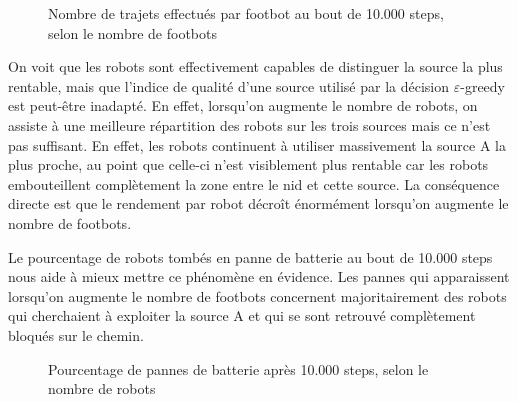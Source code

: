 \begin{figure}[htbp]
\centering
{}
\caption{Nombre de trajets effectués par footbot au bout de 10.000 steps, selon le nombre de footbots}
\end{figure}

On voit que les robots sont effectivement capables de distinguer la source la plus rentable, mais que l'indice de qualité d'une source utilisé par la décision $\varepsilon$-greedy est peut-être inadapté. En effet, lorsqu'on augmente le nombre de robots, on assiste à une meilleure répartition des robots sur les trois sources mais ce n'est pas suffisant. En effet, les robots continuent à utiliser massivement la source A la plus proche, au point que celle-ci n'est visiblement plus rentable car les robots embouteillent complètement la zone entre le nid et cette source. La conséquence directe est que le rendement par robot décroît énormément lorsqu'on augmente le nombre de footbots.

Le pourcentage de robots tombés en panne de batterie au bout de 10.000 steps nous aide à mieux mettre ce phénomène en évidence. Les pannes qui apparaissent lorsqu'on augmente le nombre de footbots concernent majoritairement des robots qui cherchaient à exploiter la source A et qui se sont retrouvé complètement bloqués sur le chemin.

\begin{figure}[htbp]
\centering
{}
\caption{Pourcentage de pannes de batterie après 10.000 steps, selon le nombre de robots}
\end{figure}

